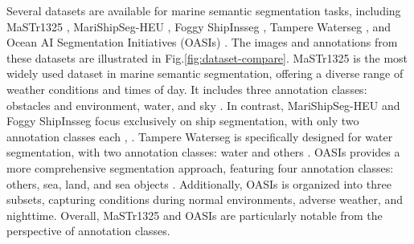 Several datasets are available for marine semantic segmentation tasks, including MaSTr1325 \cite{MaSTr1325}, 
Mari\-ShipSeg-HEU \cite{marishipseg}, Foggy ShipInsseg \cite{foggy}, Tampere Waterseg \cite{tampere}, and Ocean 
AI Segmentation Initiatives (OASIs) \cite{OASIs}. The images and annotations from these datasets are illustrated 
in Fig.\ref{fig:dataset-compare}. MaSTr1325 is the most widely used dataset in marine semantic segmentation, 
offering a diverse range of weather conditions and times of day. It includes three annotation classes: obstacles 
and environment, water, and sky \cite{MaSTr1325}. In contrast, MariShipSeg-HEU and Foggy ShipInsseg focus 
exclusively on ship segmentation, with only two annotation classes each \cite{marishipseg}, \cite{foggy}. Tampere 
Waterseg is specifically designed for water segmentation, with two annotation classes: water and others 
\cite{tampere}. OASIs provides a more comprehensive segmentation approach, featuring four annotation classes: 
others, sea, land, and sea objects \cite{OASIs}. Additionally, OASIs is organized into three subsets, capturing 
conditions during normal environments, adverse weather, and nighttime. Overall, MaSTr1325 and OASIs are particularly 
notable from the perspective of annotation classes. 


